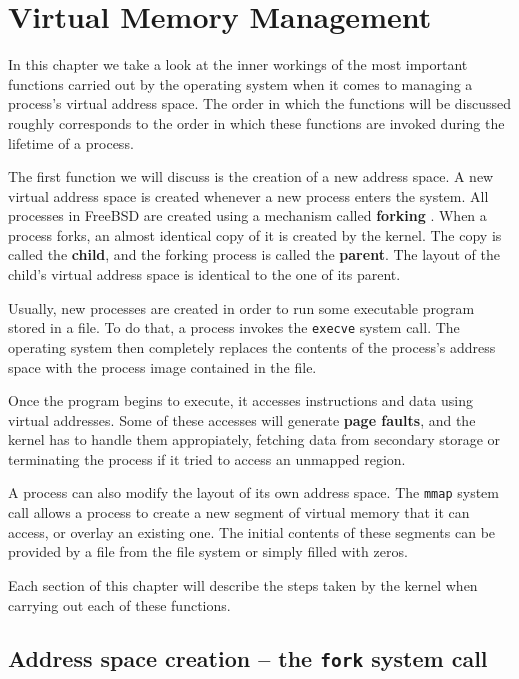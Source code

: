 \documentclass[shortabstract, english]{iithesis}
\begin{document}
\chapter{Virtual Memory Management}

In this chapter we take a look at the inner workings of the most important
functions carried out by the operating system when it comes to managing a
process's virtual address space. The order in which the functions will be
discussed roughly corresponds to the order in which these functions are invoked
during the lifetime of a process.

The first function we will discuss is the creation of a new address space. A new
virtual address space is created whenever a new process enters the system. All
processes in FreeBSD are created using a mechanism called \textbf{forking}
\cite[Section~1.6.1]{bib:tanenbaum}. When a process forks, an almost identical
copy of it is created by the kernel. The copy is called the \textbf{child}, and
the forking process is called the \textbf{parent}. The layout of the child's
virtual address space is identical to the one of its parent.

Usually, new processes are created in order to run some executable program
stored in a file. To do that, a process invokes the \texttt{execve}
\cite{freebsd:execve} system call. The operating system then completely replaces
the contents of the process's address space with the process image contained in
the file.

Once the program begins to execute, it accesses instructions and data using
virtual addresses. Some of these accesses will generate \textbf{page faults},
and the kernel has to handle them appropiately, fetching data from secondary
storage or terminating the process if it tried to access an unmapped region.

A process can also modify the layout of its own address space. The \texttt{mmap}
\cite{freebsd:mmap} system call allows a process to create a new segment of
virtual memory that it can access, or overlay an existing one. The initial
contents of these segments can be provided by a file from the file system or
simply filled with zeros.

Each section of this chapter will describe the steps taken by the kernel when
carrying out each of these functions.

\section{Address space creation -- the \texttt{fork} system call}
\end{document}
